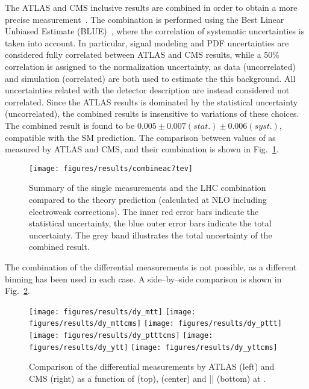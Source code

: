 The ATLAS and CMS inclusive \ac{} results are combined in order to
obtain a more precise measurement~\cite{ATLAS-CONF-2014-012}. The
combination is performed using the Best Linear Unbiased Estimate
(BLUE)~\cite{Lyons:1988rp,Valassi:2003mu}, where the correlation of
systematic uncertainties is taken into account. In particular, signal
modeling and PDF uncertainties are considered fully correlated between
ATLAS and CMS results, while a 50\% correlation is assigned to the
\wjets{} normalization uncertainty, as data (uncorrelated) and
simulation (correlated) are both used to estimate the this
background. All uncertainties related with the detector description
are instead considered not correlated. Since the ATLAS results is
dominated by the statistical uncertainty (uncorrelated), the combined
results is insensitive to variations of these choices. The combined
result is found to be $0.005\pm0.007(stat.)\pm0.006(syst.)$,
compatible with the SM prediction. The comparison between values of
\ac{} as measured by ATLAS and CMS, and their combination is shown in
Fig.~\ref{fig:combineac}.
\begin{figure}[!htb]\centering
  \texttt{[image: figures/results/combineac7tev]} 
  \caption{Summary of the single \ac{} measurements and the LHC
    combination compared to the theory prediction (calculated at NLO
    including electroweak corrections). The inner red error bars
    indicate the statistical uncertainty, the blue outer error bars
    indicate the total uncertainty. The grey band illustrates the
    total uncertainty of the combined result.} 
  \label{fig:combineac}
\end{figure}
The combination of the differential measurements is not possible, as a
different binning has been used in each case. A side--by--side
comparison is shown in Fig.~\ref{fig:comparediff7tev}. 

\begin{figure}[!htb]\centering
  \texttt{[image: figures/results/dy\_mtt]} 
  \texttt{[image: figures/results/dy\_mttcms]} 
  \texttt{[image: figures/results/dy\_pttt]} 
  \texttt{[image: figures/results/dy\_ptttcms]} 
  \texttt{[image: figures/results/dy\_ytt]} 
  \texttt{[image: figures/results/dy\_yttcms]} 
  \caption{Comparison of the differential \ac{} measurements by ATLAS
    (left) and CMS (right) as a function of \mtt{} (top), \pttt{}
    (center) and |\ytt{}| (bottom) at \seventev{}.} 
  \label{fig:comparediff7tev}
\end{figure}


